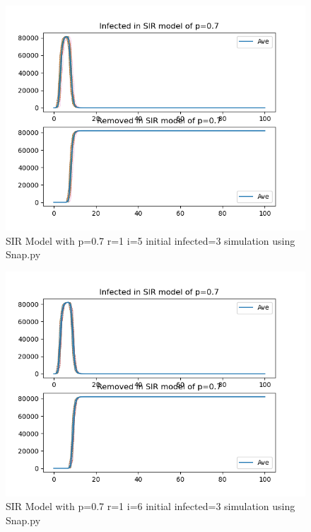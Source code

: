 \documentclass{subfile}
\begin{document}
  \begin{figure}
  \includegraphics[scale=0.8]{sirp07r1i5s3}
  \caption[SIR p=0.7,r=1,i=5,init infected=3]{SIR Model with p=0.7 r=1 i=5 initial infected=3 simulation using Snap.py}
  \end{figure}
  \begin{figure}
  \includegraphics[scale=0.8]{sirp07r1i6s3}
  \caption[SIR p=0.7,r=1,i=6,init infected=3]{SIR Model with p=0.7 r=1 i=6 initial infected=3 simulation using Snap.py}
  \end{figure}
\end{document}
